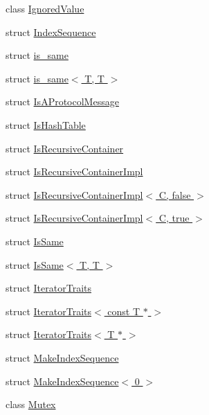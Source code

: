 \begin{DoxyCompactItemize}
\item 
class \hyperlink{classtesting_1_1internal_1_1IgnoredValue}{Ignored\+Value}
\item 
struct \hyperlink{structtesting_1_1internal_1_1IndexSequence}{Index\+Sequence}
\item 
struct \hyperlink{structtesting_1_1internal_1_1is__same}{is\+\_\+same}
\item 
struct \hyperlink{structtesting_1_1internal_1_1is__same_3_01T_00_01T_01_4}{is\+\_\+same$<$ T, T $>$}
\item 
struct \hyperlink{structtesting_1_1internal_1_1IsAProtocolMessage}{Is\+A\+Protocol\+Message}
\item 
struct \hyperlink{structtesting_1_1internal_1_1IsHashTable}{Is\+Hash\+Table}
\item 
struct \hyperlink{structtesting_1_1internal_1_1IsRecursiveContainer}{Is\+Recursive\+Container}
\item 
struct \hyperlink{structtesting_1_1internal_1_1IsRecursiveContainerImpl}{Is\+Recursive\+Container\+Impl}
\item 
struct \hyperlink{structtesting_1_1internal_1_1IsRecursiveContainerImpl_3_01C_00_01false_01_4}{Is\+Recursive\+Container\+Impl$<$ C, false $>$}
\item 
struct \hyperlink{structtesting_1_1internal_1_1IsRecursiveContainerImpl_3_01C_00_01true_01_4}{Is\+Recursive\+Container\+Impl$<$ C, true $>$}
\item 
struct \hyperlink{structtesting_1_1internal_1_1IsSame}{Is\+Same}
\item 
struct \hyperlink{structtesting_1_1internal_1_1IsSame_3_01T_00_01T_01_4}{Is\+Same$<$ T, T $>$}
\item 
struct \hyperlink{structtesting_1_1internal_1_1IteratorTraits}{Iterator\+Traits}
\item 
struct \hyperlink{structtesting_1_1internal_1_1IteratorTraits_3_01const_01T_01_5_01_4}{Iterator\+Traits$<$ const T $\ast$ $>$}
\item 
struct \hyperlink{structtesting_1_1internal_1_1IteratorTraits_3_01T_01_5_01_4}{Iterator\+Traits$<$ T $\ast$ $>$}
\item 
struct \hyperlink{structtesting_1_1internal_1_1MakeIndexSequence}{Make\+Index\+Sequence}
\item 
struct \hyperlink{structtesting_1_1internal_1_1MakeIndexSequence_3_010_01_4}{Make\+Index\+Sequence$<$ 0 $>$}
\item 
class \hyperlink{classtesting_1_1internal_1_1Mutex}{Mutex}
\item 

\end{DoxyCompactItemize}
